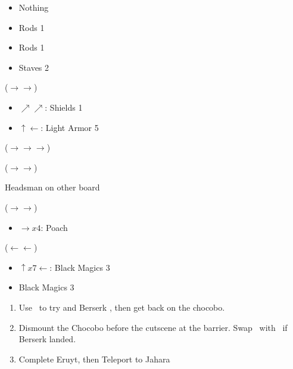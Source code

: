 \begin{liscense}
\begin{itemize}
	\baschf
	\begin{itemize}
		\item Nothing
	\end{itemize}
	\ashef \rightb
	\begin{itemize}
		\item Rods 1
	\end{itemize}
	\penelof \rightb
	\begin{itemize}
		\item Rods 1
	\end{itemize}
	\ashef \leftb
	\begin{itemize} 
		\item Staves 2
	\end{itemize}
	\vaanf ($\rightarrow\rightarrow$)
		\begin{itemize}
		\item $\nearrow\nearrow$: Shields 1
		\item $\uparrow\leftarrow$: Light Armor 5
	\end{itemize}
	\baschf ($\rightarrow\rightarrow\rightarrow$)
	\begin{itemize}
	\end{itemize}
	\penelof ($\rightarrow\rightarrow$)
		\begin{itemize}
		\uprightl Headsman on other board
		\end{itemize}
	\balthierf ($\rightarrow\rightarrow$)
	\begin{itemize}
		\item $\rightarrow x4$: Poach
		\downl{Traveler}
	\end{itemize}
	\penelof ($\leftarrow\leftarrow$)
	\begin{itemize}
		\item $\uparrow x7 \leftarrow$: Black Magics 3
	\end{itemize}
	\ashef \leftb
	\begin{itemize}
		\item Black Magics 3
	\end{itemize}
\end{itemize}
\end{liscense}
\begin{enumerate}
	\item Use \penelo\ to try and Berserk \basch, then get back on the chocobo.
	\item Dismount the Chocobo before the cutscene at the barrier. Swap \basch\ with \balthier\ if Berserk landed.
	\item Complete Eruyt, then Teleport to Jahara
\end{enumerate}
